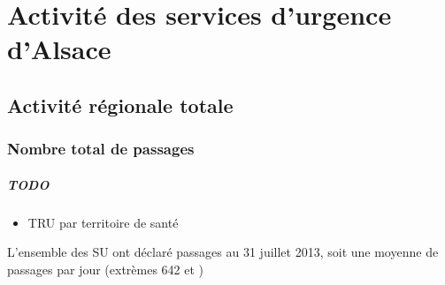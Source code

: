 \documentclass[12pt,english,french,twoside]{report}\usepackage[]{graphicx}\usepackage[]{color}
\begin{document}
\part{Activité des services d'urgence d'Alsace}
\chapter{Activité régionale totale}
\section*{Nombre total de passages}

\subsubsection*{TODO}
\begin{itemize}
  \item TRU par territoire de santé
\end{itemize}







L'ensemble des SU ont déclaré  passages au 31 juillet 2013, 
soit une moyenne de  passages par jour (extrèmes 642 et )
\end{document}
